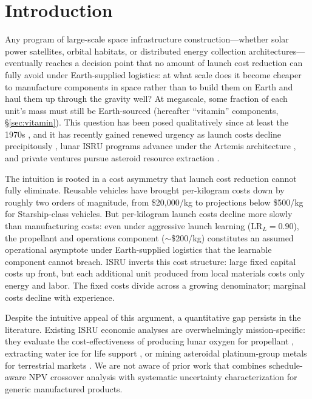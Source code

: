 \documentclass[preprint,12pt]{elsarticle}
\begin{document}
\linenumbers

\section{Introduction}
\label{sec:introduction}

Any program of large-scale space infrastructure construction---whether solar power satellites, orbital habitats, or distributed energy collection architectures---eventually reaches a decision point that no amount of launch cost reduction can fully avoid under Earth-supplied logistics: at what scale does it become cheaper to manufacture components in space rather than to build them on Earth and haul them up through the gravity well? At megascale, some fraction of each unit's mass must still be Earth-sourced (hereafter ``vitamin'' components, \S\ref{sec:vitamin}). This question has been posed qualitatively since at least the 1970s \cite{oneill1974,oneill1976}, and it has recently gained renewed urgency as launch costs decline precipitously \cite{jones2018}, lunar ISRU programs advance under the Artemis architecture \cite{sanders2015}, and private ventures pursue asteroid resource extraction \cite{elvis2012,andrews2015}.

The intuition is rooted in a cost asymmetry that launch cost reduction cannot fully eliminate. Reusable vehicles have brought per-kilogram costs down by roughly two orders of magnitude, from \$20{,}000/kg to projections below \$500/kg for Starship-class vehicles. But per-kilogram launch costs decline more slowly than manufacturing costs: even under aggressive launch learning (LR$_L = 0.90$), the propellant and operations component ($\sim$\$200/kg) constitutes an assumed operational asymptote under Earth-supplied logistics that the learnable component cannot breach. ISRU inverts this cost structure: large fixed capital costs up front, but each additional unit produced from local materials costs only energy and labor. The fixed costs divide across a growing denominator; marginal costs decline with experience.

Despite the intuitive appeal of this argument, a quantitative gap persists in the literature. Existing ISRU economic analyses are overwhelmingly mission-specific: they evaluate the cost-effectiveness of producing lunar oxygen for propellant \cite{sanders2015}, extracting water ice for life support \cite{zubrin1996}, or mining asteroidal platinum-group metals for terrestrial markets \cite{sonter1997,elvis2012}. We are not aware of prior work that combines schedule-aware NPV crossover analysis with systematic uncertainty characterization for generic manufactured products.
\end{document}
